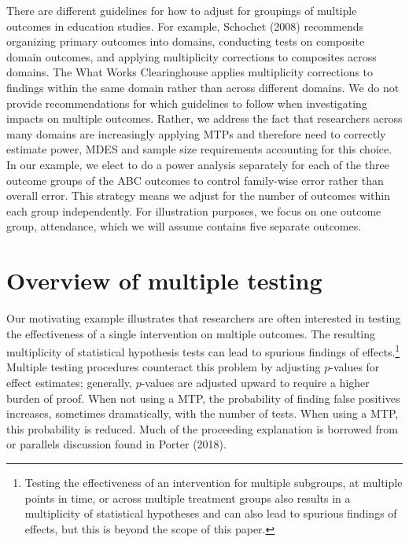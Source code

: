 \documentclass[
]{article}
\begin{document}
There are different guidelines for how to adjust for groupings of
multiple outcomes in education studies. For example, Schochet (2008)
recommends organizing primary outcomes into domains, conducting tests on
composite domain outcomes, and applying multiplicity corrections to
composites across domains. The What Works Clearinghouse applies
multiplicity corrections to findings within the same domain rather than
across different domains. We do not provide recommendations for which
guidelines to follow when investigating impacts on multiple outcomes.
Rather, we address the fact that researchers across many domains are
increasingly applying MTPs and therefore need to correctly estimate
power, MDES and sample size requirements accounting for this choice. In
our example, we elect to do a power analysis separately for each of the
three outcome groups of the ABC outcomes to control family-wise error
rather than overall error. This strategy means we adjust for the number
of outcomes within each group independently. For illustration purposes,
we focus on one outcome group, attendance, which we will assume contains
five separate outcomes.

\section{Overview of multiple testing}
\label{sec:mtp_overview}

Our motivating example illustrates that researchers are often interested
in testing the effectiveness of a single intervention on multiple
outcomes. The resulting multiplicity of statistical hypothesis tests can
lead to spurious findings of
effects.\footnote{Testing the effectiveness of an intervention for multiple subgroups, at multiple points in time, or across multiple treatment groups also results in a multiplicity of statistical hypotheses and can also lead to spurious findings of effects, but this is beyond the scope of this paper.}
Multiple testing procedures counteract this problem by adjusting
\(p\)-values for effect estimates; generally, \(p\)-values are adjusted
upward to require a higher burden of proof. When not using a MTP, the
probability of finding false positives increases, sometimes
dramatically, with the number of tests. When using a MTP, this
probability is reduced. Much of the proceeding explanation is borrowed
from or parallels discussion found in Porter (2018).
\end{document}
